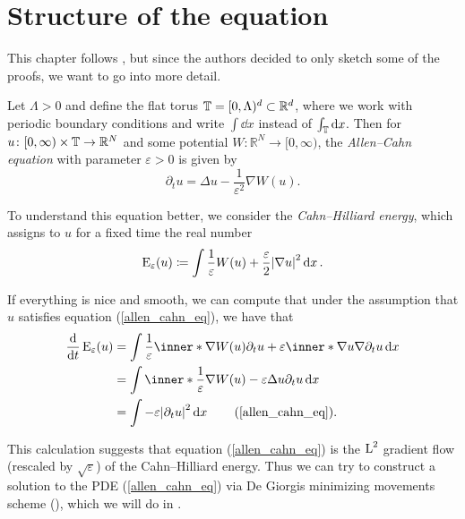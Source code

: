 \section{Structure of the equation}

This chapter follows \cite{convergence_of_allen_cahn_equation_to_multiphase_mean_curvature_flow}, but since the authors decided to only sketch some of the proofs, we want to go into more detail.

Let $ \Lambda > 0 $ and define the flat torus 
$ \operatorname{\mathbb{T}} = [0, \Lambda )^{ d } \subset \mathbb{ R }^{ d } $, 
where we work with periodic boundary conditions and write $ \int \dd{x} $ instead of $ \int_{ \operatorname{\mathbb{T}} } \dd{x} $.
Then for 
$ u \colon [ 0 , \infty ) \times \operatorname{\mathbb{T}} \to \mathbb{ R }^{ N } $ 
and some potential 
$ W \colon \mathbb{ R }^{ N } \to [0, \infty ) $,
the \emph{Allen--Cahn equation} with parameter $ \varepsilon > 0 $ is given by
\begin{equation}
	\label{allen_cahn_eq}
	\partial_{ t } u 
	=
	\Delta u - \frac{1 }{ \varepsilon^{ 2 } } \nabla W ( u ).
\end{equation}

To understand this equation better, we consider the \emph{Cahn--Hilliard 
energy}, which assigns to $ u $ for a fixed time the real number
\begin{equation}
	\label{cahn_hilliard_energy}
	\operatorname{E}_{ \varepsilon } 
	(u)
	\coloneqq
	\int
	\frac{ 1 }{ \varepsilon }
	W ( u )
	+
	\frac{ \varepsilon }{ 2 }
	\abs{ \nabla u }^{ 2 }
	\dd{x}.
\end{equation}

If everything is nice and smooth, we can compute that under the assumption that $ u $ satisfies 
equation (\ref{allen_cahn_eq}), we have that
\begin{align*}
	\dv{t} \energy_{ \varepsilon } ( u )
	&=
	\int
	\frac{ 1 }{ \varepsilon }
	\inner*{\nabla W ( u )}{ \partial_{ t } u}
	+
	\varepsilon
	\inner*{\nabla u}{ \nabla \partial_{ t } u}
	\dd{x}
	\\
	&=
	\int
	\inner*{ \frac{ 1 }{\varepsilon } \nabla W ( u ) - \varepsilon \Delta u  }{ \partial_{ t } u }
	\dd{x}
	\\
	&=
	\int - \varepsilon \abs{ \partial_{ t } u }^{ 2 } \dd{ x }
	\tag{\ref{allen_cahn_eq}}.
\end{align*}

This calculation suggests that equation (\ref{allen_cahn_eq}) is the $ \operatorname{L}^{ 2 
} $ gradient flow (rescaled by $ \sqrt{\varepsilon} $) of the Cahn--Hilliard 
energy. Thus we can try to construct a solution to the PDE 
(\ref{allen_cahn_eq}) via De Giorgis minimizing movements scheme 
(\cite{de_giorgi_new_problems_on_minimizing_movements}), which we will do in 
.

